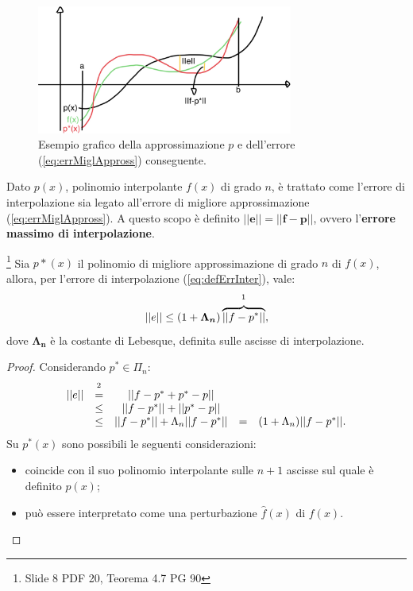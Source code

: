 \begin{figure}
    \centering
    \includegraphics[width=0.75\textwidth]{immagini/esempioGrafMiglApprox.jpg}
    \caption{Esempio grafico della approssimazione $p$ e dell'errore (\ref{eq:errMiglAppross}) conseguente.}\label{fig:esempioGrafMiglApprox}
\end{figure}

Dato $p(x)$, polinomio interpolante $f(x)$ di grado $n$, è trattato come l'errore di interpolazione sia legato all'errore di migliore approssimazione (\ref{eq:errMiglAppross}). A questo scopo è definito $\boldsymbol{||e||=||f-p||}$, ovvero l'\textbf{errore massimo di interpolazione}.

\begin{theorem}\label{th:approxErrMiglApprox}\footnote{Slide 8 PDF 20, Teorema 4.7 PG 90}
    Sia $p*(x)$ il polinomio di migliore approssimazione di grado $n$ di $f(x)$, allora, per l'errore di interpolazione (\ref{eq:defErrInter}), vale:
    \begin{equation}\label{eq:errInterpMiglApprox}
        ||e||\leq (1+\boldsymbol{\Lambda_n})\overbrace{||f-p^*||}^{\footnotemark},
    \end{equation}
    dove $\boldsymbol{\Lambda_n}$ è la costante di Lebesque, definita sulle ascisse di interpolazione.
\end{theorem}
\begin{proof}
Considerando $p^*\in\Pi_n$:
    \begin{equation*}
        \begin{matrix}
            ||e||&\overset{\footnotemark}{=}&||f-p^*+p^*-p||\\
            &\leq& ||f-p^*||+||p^*-p||\\
            &\leq& ||f-p^*||+\Lambda_n||f-p^*||
            &=&(1+\Lambda_n)||f-p^*||.
        \end{matrix}
    \end{equation*}
    Su $p^*(x)$ sono possibili le seguenti considerazioni:
    \begin{itemize}
        \item coincide con il suo polinomio interpolante sulle $n+1$ ascisse sul quale è definito $p(x)$;
        \item può essere interpretato come una perturbazione $\widehat f(x)$ di $f(x)$.
    \end{itemize}
\end{proof}


